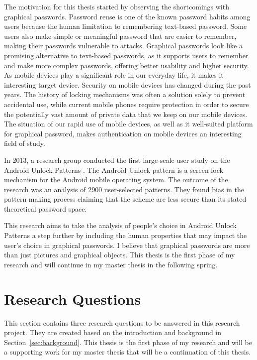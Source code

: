     The motivation for this thesis started by observing the shortcomings with graphical passwords. Password reuse is one of the known password habits among users because the human limitation to remembering text-based password. Some users also make simple or meaningful password that are easier to remember, making their passwords vulnerable to attacks. Graphical passwords look like a promising alternative to text-based passwords, as it supports users to remember and make more complex passwords, offering better usability and higher security. As mobile devices play a significant role in our everyday life, it makes it interesting target device. Security on mobile devices has changed during the past years. The history of locking mechanisms was often a solution solely to prevent accidental use, while current mobile phones require protection in order to secure the potentially vast amount of private data that we keep on our mobile devices. The situation of our rapid use of mobile devices, as well as it well-suited platform for graphical password, makes authentication on mobile devices an interesting field of study.

    In 2013, a research group conducted the first large-scale user study on the Android Unlock Patterns \cite{Uellenbeck}. The Android Unlock pattern is a screen lock mechanism for the Android mobile operating system. The outcome of the research was an analysis of 2900 user-selected patterns. They found bias in the pattern making process claiming that the scheme are less secure than its stated theoretical password space.

    This research aims to take the analysis of people's choice in Android Unlock Patterns a step further by including the human properties that may impact the user's choice in graphical passwords. I believe that graphical passwords are more than just pictures and graphical objects. This thesis is the first phase of my research and will continue in my master thesis in the following spring.

  \section{Research Questions} \label{sec:researchquestions}
    
    This section contains three research questions to be answered in this research project. They are created based on the introduction and background in Section~\ref{sec:background}. This thesis is the first phase of my research and will be a supporting work for my master thesis that will be a continuation of this thesis.


